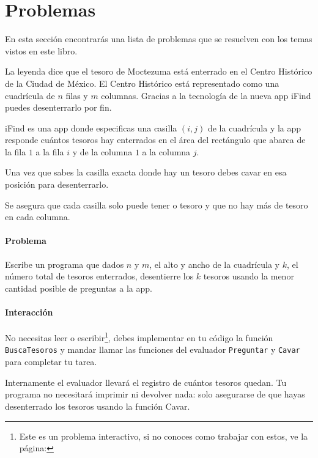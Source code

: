 \chapter*{Problemas}

En esta sección encontrarás una lista de problemas que se resuelven con los temas vistos en este libro.

\startproblemlist
\renewcommand{\problemgroup}{E}

\problemtitle La leyenda dice que el tesoro de Moctezuma está enterrado en el Centro Histórico de la Ciudad de México. El Centro Histórico está representado como una cuadrícula de \(n\) filas y \(m\) columnas. Gracias a la tecnología de la nueva app iFind puedes desenterrarlo por fin.

iFind es una app donde especificas una casilla \((i,j)\) de la cuadrícula y la app responde cuántos tesoros hay enterrados en el área del rectángulo que abarca de la fila \(1\) a la fila \(i\) y de la columna \(1\) a la columna \(j\).

Una vez que sabes la casilla exacta donde hay un tesoro debes cavar en esa posición para desenterrarlo.

Se asegura que cada casilla solo puede tener  o  tesoro y que no hay más de  tesoro en cada columna.

\subsubsection*{Problema}
Escribe un programa que dados \(n\) y \(m\), el alto y ancho de la cuadrícula y \(k\), el número total de tesoros enterrados, desentierre los \(k\) tesoros usando la menor cantidad posible de preguntas a la app.

\subsubsection*{Interacción}
No necesitas leer o escribir\footnote{Este es un problema interactivo, si no conoces como trabajar con estos, ve la página: \pageref{interactivos}}, debes implementar en tu código la función \verb|BuscaTesoros| y mandar llamar las funciones del evaluador \verb|Preguntar| y \verb|Cavar| para completar tu tarea.

Internamente el evaluador llevará el registro de cuántos tesoros quedan. Tu programa no necesitará imprimir ni devolver nada: solo asegurarse de que hayas desenterrado los  tesoros usando la función Cavar.

